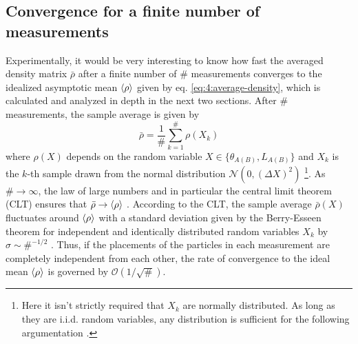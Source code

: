 \subsection*{Convergence for a finite number of measurements}
Experimentally, it would be very interesting to know how fast the averaged density matrix $\bar{\rho}$ after a finite number of $\#$ measurements converges to the idealized asymptotic mean $\left\langle\rho\right\rangle$ given by eq. \eqref{eq:4:average-density}, which is calculated and analyzed in depth in the next two sections.
After $\#$ measurements, the sample average is given by
\begin{equation}
  \bar{\rho} = \frac{1}{\#} \sum_{k=1}^{\#} \rho(X_k)
\end{equation}
where $\rho(X)$ depends on the random variable $X \in \{\theta_{A(B)}, L_{A(B)}\}$ and $X_k$ is the $k$-th sample drawn from the normal distribution $\mathcal{N}(0, (\Delta X)^2)$ \footnote{Here it isn't strictly required that $X_k$ are normally distributed. As long as they are i.i.d. random variables, any distribution is sufficient for the following argumentation \cite[p. 1195]{Riley_2018}.}.
As $\# \rightarrow \infty$, the law of large numbers and in particular the central limit theorem (CLT) ensures that $\bar{\rho} \rightarrow \left\langle\rho\right\rangle$ \cite[p. 1195]{Riley_2018}.
According to the CLT, the sample average $\bar{\rho}(X)$ fluctuates around $\left\langle\rho\right\rangle$ with a standard deviation given by the Berry-Esseen theorem for independent and identically distributed random variables $X_k$ by $\sigma \sim \#^{-1/2}$ \cite{Berry_1941}.
Thus, if the placements of the particles in each measurement are completely independent from each other, the rate of convergence to the ideal mean $\left\langle\rho\right\rangle$ is governed by $\mathcal{O}(1/\sqrt{\#})$.


